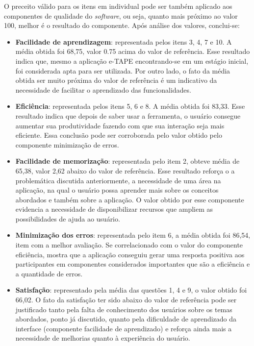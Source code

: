 O preceito válido para os itens em individual pode ser também aplicado aos componentes de qualidade do \textit{software}, ou seja, quanto mais próximo ao valor 100, melhor é o resultado do componente.
Após análise dos valores, conclui-se:
\begin{itemize}
    \item \textbf{Facilidade de aprendizagem}: representada pelos itens 3, 4, 7 e 10. A média obtida foi 68,75, valor 0.75 acima do valor de referência. Esse resultado indica que, mesmo a aplicação e-TAPE encontrando-se em um estágio inicial, foi considerada apta para ser utilizada. Por outro lado, o fato da média obtida ser muito próxima do valor de referência é um indicativo da necessidade de facilitar o aprendizado das funcionalidades. 

    \item \textbf{Eficiência}: representada pelos itens 5, 6 e 8. A média obtida foi 83,33. Esse resultado indica que depois de saber usar a ferramenta, o usuário consegue aumentar sua produtividade fazendo com que sua interação seja mais eficiente. Essa conclusão pode ser corroborada pelo valor obtido pelo componente minimização de erros.

    \item \textbf{Facilidade de memorização}: representada pelo item 2, obteve média de 65,38, valor 2,62 abaixo do valor de referência. Esse resultado reforça o a problemática discutida anteriormente, a necessidade de uma área na aplicação, na qual o usuário possa aprender mais sobre os conceitos abordados e também sobre 
          a aplicação. O valor obtido por esse componente evidencia a necessidade de disponibilizar recursos que ampliem as possibilidades de ajuda ao usuário.

    \item \textbf{Minimização dos erros}: representada pelo item 6, a média obtida foi 86,54, item com a melhor avaliação. Se correlacionado com o valor do componente eficiência, mostra que a aplicação conseguiu gerar uma resposta positiva aos participantes em componentes considerados importantes que são a eficiência e a quantidade de erros. 

    \item \textbf{Satisfação}: representado pela média das questões 1, 4 e 9, o valor obtido foi 66,02. O fato da satisfação ter sido abaixo do valor de referência pode ser justificado tanto pela falta de conhecimento dos usuários sobre os temas abordados, ponto já discutido, quanto pela dificuldade de aprendizado da interface (componente facilidade de aprendizado) e reforça ainda mais a necessidade de melhorias quanto à experiência do usuário. 
         
\end{itemize}

